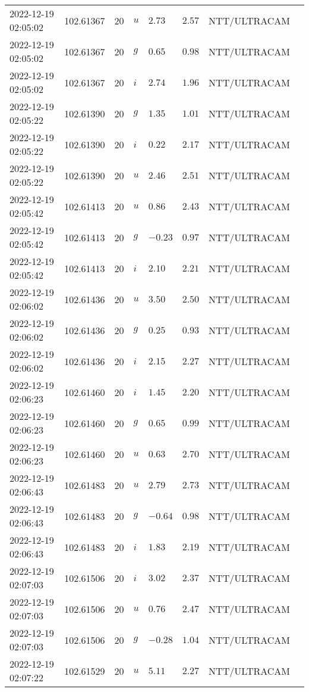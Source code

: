 \documentclass{nature_plusfigure}
\begin{document}
\begin{supplement}
\begin{center}
\begin{longtable}{llllllll}
2022-12-19 02:05:02 & 102.61367 & 20 & $u$ & $2.73$ & $2.57$ & NTT/ULTRACAM &  \\ 
2022-12-19 02:05:02 & 102.61367 & 20 & $g$ & $0.65$ & $0.98$ & NTT/ULTRACAM &  \\ 
2022-12-19 02:05:02 & 102.61367 & 20 & $i$ & $2.74$ & $1.96$ & NTT/ULTRACAM &  \\ 
2022-12-19 02:05:22 & 102.61390 & 20 & $g$ & $1.35$ & $1.01$ & NTT/ULTRACAM &  \\ 
2022-12-19 02:05:22 & 102.61390 & 20 & $i$ & $0.22$ & $2.17$ & NTT/ULTRACAM &  \\ 
2022-12-19 02:05:22 & 102.61390 & 20 & $u$ & $2.46$ & $2.51$ & NTT/ULTRACAM &  \\ 
2022-12-19 02:05:42 & 102.61413 & 20 & $u$ & $0.86$ & $2.43$ & NTT/ULTRACAM &  \\ 
2022-12-19 02:05:42 & 102.61413 & 20 & $g$ & $-0.23$ & $0.97$ & NTT/ULTRACAM &  \\ 
2022-12-19 02:05:42 & 102.61413 & 20 & $i$ & $2.10$ & $2.21$ & NTT/ULTRACAM &  \\ 
2022-12-19 02:06:02 & 102.61436 & 20 & $u$ & $3.50$ & $2.50$ & NTT/ULTRACAM &  \\ 
2022-12-19 02:06:02 & 102.61436 & 20 & $g$ & $0.25$ & $0.93$ & NTT/ULTRACAM &  \\ 
2022-12-19 02:06:02 & 102.61436 & 20 & $i$ & $2.15$ & $2.27$ & NTT/ULTRACAM &  \\ 
2022-12-19 02:06:23 & 102.61460 & 20 & $i$ & $1.45$ & $2.20$ & NTT/ULTRACAM &  \\ 
2022-12-19 02:06:23 & 102.61460 & 20 & $g$ & $0.65$ & $0.99$ & NTT/ULTRACAM &  \\ 
2022-12-19 02:06:23 & 102.61460 & 20 & $u$ & $0.63$ & $2.70$ & NTT/ULTRACAM &  \\ 
2022-12-19 02:06:43 & 102.61483 & 20 & $u$ & $2.79$ & $2.73$ & NTT/ULTRACAM &  \\ 
2022-12-19 02:06:43 & 102.61483 & 20 & $g$ & $-0.64$ & $0.98$ & NTT/ULTRACAM &  \\ 
2022-12-19 02:06:43 & 102.61483 & 20 & $i$ & $1.83$ & $2.19$ & NTT/ULTRACAM &  \\ 
2022-12-19 02:07:03 & 102.61506 & 20 & $i$ & $3.02$ & $2.37$ & NTT/ULTRACAM &  \\ 
2022-12-19 02:07:03 & 102.61506 & 20 & $u$ & $0.76$ & $2.47$ & NTT/ULTRACAM &  \\ 
2022-12-19 02:07:03 & 102.61506 & 20 & $g$ & $-0.28$ & $1.04$ & NTT/ULTRACAM &  \\ 
2022-12-19 02:07:22 & 102.61529 & 20 & $u$ & $5.11$ & $2.27$ & NTT/ULTRACAM &  \\ 

\end{longtable}
\end{center}
\end{supplement}
\end{document}
